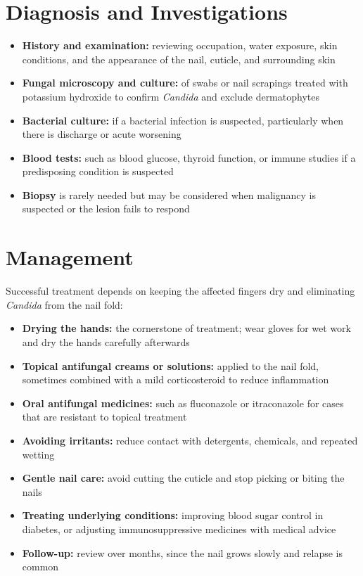 \section*{Diagnosis and Investigations}
\begin{itemize}
    \item \textbf{History and examination:} reviewing occupation, water exposure, skin conditions, and the appearance of the nail, cuticle, and surrounding skin
    \item \textbf{Fungal microscopy and culture:} of swabs or nail scrapings treated with potassium hydroxide to confirm \textit{Candida} and exclude dermatophytes
    \item \textbf{Bacterial culture:} if a bacterial infection is suspected, particularly when there is discharge or acute worsening
    \item \textbf{Blood tests:} such as blood glucose, thyroid function, or immune studies if a predisposing condition is suspected
    \item \textbf{Biopsy} is rarely needed but may be considered when malignancy is suspected or the lesion fails to respond
\end{itemize}

\section*{Management}
Successful treatment depends on keeping the affected fingers dry and eliminating \textit{Candida} from the nail fold:
\begin{itemize}
    \item \textbf{Drying the hands:} the cornerstone of treatment; wear gloves for wet work and dry the hands carefully afterwards
    \item \textbf{Topical antifungal creams or solutions:} applied to the nail fold, sometimes combined with a mild corticosteroid to reduce inflammation
    \item \textbf{Oral antifungal medicines:} such as fluconazole or itraconazole for cases that are resistant to topical treatment
    \item \textbf{Avoiding irritants:} reduce contact with detergents, chemicals, and repeated wetting
    \item \textbf{Gentle nail care:} avoid cutting the cuticle and stop picking or biting the nails
    \item \textbf{Treating underlying conditions:} improving blood sugar control in diabetes, or adjusting immunosuppressive medicines with medical advice
    \item \textbf{Follow-up:} review over months, since the nail grows slowly and relapse is common
\end{itemize}


